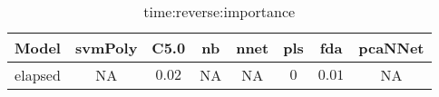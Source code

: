 \begin{table}[!ht]
	\centering
	\begin{tabular}{|c|c|c|c|c|c|c|c|}
		\hline
		Model & svmPoly & C5.0 & nb & nnet & pls & fda & pcaNNet \\ \hline
		elapsed & NA & $0.02$ & NA & NA & $0$ & $0.01$ & NA \\ \hline
	\end{tabular}
	\caption{time:reverse:importance}
	\label{tab:time:reverse:importance}
\end{table}
